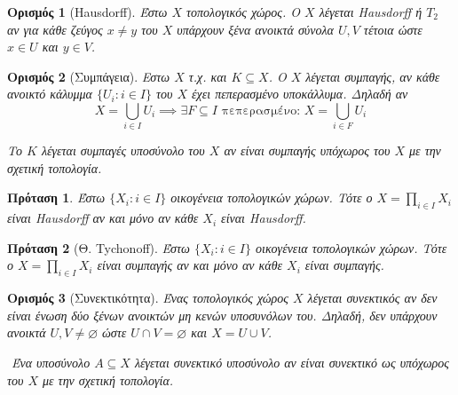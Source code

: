 \documentclass[oneside,a4paper]{article}
\newtheorem*{defn}{Ορισμός}
\newtheorem{prop}{Πρόταση}
\newcommand {\tl}{\textlatin}
\begin{document}
\begin{defn}[\tl{Hausdorff}]
	Έστω $X$ τοπολογικός χώρος. Ο $X$ λέγεται \tl{Hausdorff} ή $T_2$ αν για κάθε ζεύγος $x\neq y$ του $X$ υπάρχουν ξένα ανοικτά σύνολα $U,V$ τέτοια ώστε $x \in U$ και $y \in V$.
\end{defn}

\vspace{0.1cm}

\begin{defn}[Συμπάγεια]
	Εστω $X$ τ.χ. και $K \subseteq X$. Ο $X$ λέγεται συμπαγής, αν κάθε ανοικτό κάλυμμα $\{U_i: i \in I\}$ του $X$ έχει πεπερασμένο υποκάλλυμα. Δηλαδή αν
	$$X = \bigcup\limits_{i \in I} U_i \implies \exists F \subseteq I \text{ πεπερασμένο: } X = \bigcup\limits_{i \in F} U_i$$

	Το $K$ λέγεται συμπαγές υποσύνολο του $X$ αν είναι συμπαγής υπόχωρος του $X$ με την σχετική τοπολογία.
\end{defn}

\vspace{0.1cm}

\begin{prop} Έστω $\{X_i : i \in I\}$ οικογένεια τοπολογικών χώρων. Τότε  ο $X = \prod\limits_{i \in I} X_i$ είναι \tl{Hausdorff} αν και μόνο αν κάθε $X_i$ είναι \tl{Hausdorff}.
\end{prop}

\vspace{0.1cm}

\begin{prop}[Θ. \tl{Tychonoff}] Έστω $\{X_i : i \in I\}$ οικογένεια τοπολογικών χώρων. Τότε  ο $X = \prod\limits_{i \in I} X_i$ είναι συμπαγής αν και μόνο αν κάθε $X_i$ είναι συμπαγής.
\end{prop}

\vspace{0.1cm}

\begin{defn}[Συνεκτικότητα]
	Ένας τοπολογικός χώρος $X$ λέγεται συνεκτικός αν δεν είναι ένωση δύο ξένων ανοικτών μη κενών υποσυνόλων του. Δηλαδή, δεν υπάρχουν ανοικτά $U,V \neq \varnothing$ ώστε $U\cap V = \varnothing$ και $X = U\cup V$.

	$ $\newline
	Ένα υποσύνολο $A\subseteq X$ λέγεται συνεκτικό υποσύνολο αν είναι συνεκτικό ως υπόχωρος του $X$ με την σχετική τοπολογία.
\end{defn}

\vspace{0.1cm}
\end{document}

